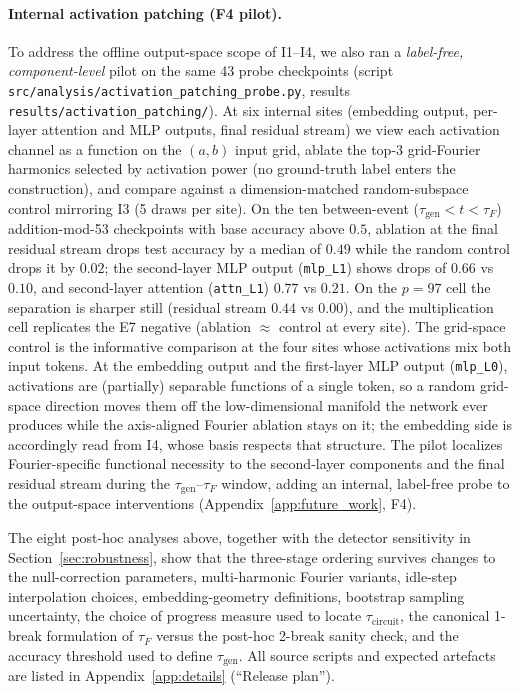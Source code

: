 \documentclass{article}
\newcommand{\taug}{\tau_{\mathrm{gen}}}
\newcommand{\tauf}{\tau_{F}}
\newcommand{\taucirc}{\tau_{\mathrm{circuit}}}
\begin{document}
\paragraph{Internal activation patching (F4 pilot).}
To address the offline output-space scope of I1--I4, we also ran a
\emph{label-free, component-level} pilot on the same 43 probe
checkpoints (script
\texttt{src/analysis/activation\_patching\_probe.py}, results
\texttt{results/activation\_patching/}).
At six internal sites (embedding output, per-layer attention and
MLP outputs, final residual stream) we view each activation channel
as a function on the $(a,b)$ input grid, ablate the top-$3$
grid-Fourier harmonics selected by activation power (no ground-truth
label enters the construction), and compare against a
dimension-matched random-subspace control mirroring I3
(5 draws per site).
On the ten between-event ($\taug{<}t{<}\tauf$) addition-mod-53
checkpoints with base accuracy above $0.5$, ablation at the final
residual stream drops test accuracy by a median of $0.49$ while the
random control drops it by $0.02$; the second-layer MLP output
(\texttt{mlp\_L1}) shows
drops of $0.66$ vs $0.10$, and second-layer attention
(\texttt{attn\_L1}) $0.77$ vs $0.21$.
On the $p{=}97$ cell the separation is sharper still (residual
stream $0.44$ vs $0.00$), and the multiplication cell replicates
the E7 negative (ablation ${\approx}$ control at every site).
The grid-space control is the informative comparison at the four
sites whose activations mix both input tokens.
At the embedding output and the first-layer MLP output
(\texttt{mlp\_L0}), activations are (partially) separable
functions of a single token, so a random grid-space direction
moves them off the low-dimensional manifold the network ever
produces while the axis-aligned Fourier ablation stays on it;
the embedding side is accordingly read from I4, whose basis
respects that structure.
The pilot localizes Fourier-specific functional necessity to the
second-layer components and the final residual stream during the
$\taug$--$\tauf$ window, adding an internal, label-free probe to
the output-space interventions
(Appendix~\ref{app:future_work}, F4).

The eight post-hoc analyses above, together with the detector
sensitivity in Section~\ref{sec:robustness}, show that the
three-stage ordering survives changes to the null-correction
parameters, multi-harmonic Fourier variants, idle-step
interpolation choices, embedding-geometry definitions,
bootstrap sampling uncertainty, the choice of progress measure
used to locate $\taucirc$, the canonical 1-break formulation of
$\tauf$ versus the post-hoc 2-break sanity check, and the
accuracy threshold used to define $\taug$.
All source scripts and expected artefacts are listed in
Appendix~\ref{app:details} (``Release plan'').
\end{document}
